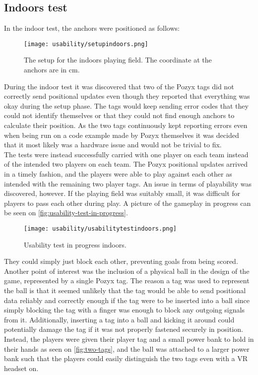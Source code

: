\subsection{Indoors test}
In the indoor test, the anchors were positioned as follows:
\begin{figure}[H]
    \centering
    \texttt{[image: usability/setupindoors.png]}
    \caption{The setup for the indoors playing field. The coordinate at the anchors are in cm.}
    \label{fig:test2-indoor-setup}
\end{figure}
\noindent
During the indoor test it was discovered that two of the Pozyx tags did not correctly send positional updates even though they reported that everything was okay during the setup phase.
The tags would keep sending error codes that they could not identify themselves or that they could not find enough anchors to calculate their position.
As the two tags continuously kept reporting errors even when being run on a code example made by Pozyx themselves it was decided that it most likely was a hardware issue and would not be trivial to fix.
\\
The tests were instead successfully carried with one player on each team instead of the intended two players on each team.
The Pozyx positional updates arrived in a timely fashion, and the players were able to play against each other as intended with the remaining two player tags.
An issue in terms of playability was discovered, however.
If the playing field was suitably small, it was difficult for players to pass each other during play.
A picture of the gameplay in progress can be seen on \autoref{fig:usability-test-in-progress}.
\begin{figure}[H]
    \centering
    \texttt{[image: usability/usabilitytestindoors.png]}
    \caption{Usability test in progress indoors.}
    \label{fig:usability-test-in-progress.}
\end{figure}
\noindent
They could simply just block each other, preventing goals from being scored.
Another point of interest was the inclusion of a physical ball in the design of the game, represented by a single Pozyx tag.
The reason a tag was used to represent the ball is that it seemed unlikely that the tag would be able to send positional data reliably and correctly enough if the tag were to be inserted into a ball since simply blocking the tag with a finger was enough to block any outgoing signals from it.
Additionally, inserting a tag into a ball and kicking it around could potentially damage the tag if it was not properly fastened securely in position.
Instead, the players were given their player tag and a small power bank to hold in their hands as seen on \autoref{fig:two-tags}, and the ball was attached to a larger power bank such that the players could easily distinguish the two tags even with a VR headset on.

